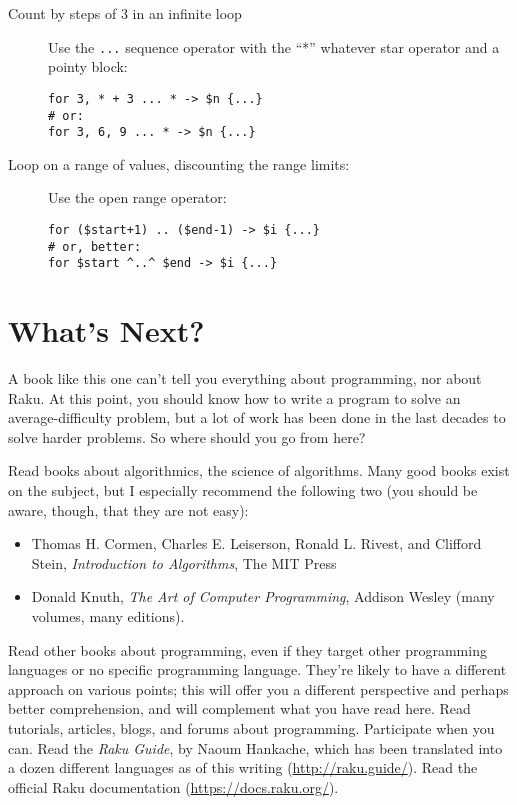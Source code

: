 \begin{description}
\item[Count by steps of 3 in an infinite loop] Use the \verb'...' 
sequence operator with the ``*'' whatever star operator and 
a pointy block:

\begin{verbatim}
for 3, * + 3 ... * -> $n {...}
# or:
for 3, 6, 9 ... * -> $n {...}    
\end{verbatim}

\item[Loop on a range of values, discounting the range limits:] Use 
the open range operator:

\begin{verbatim}
for ($start+1) .. ($end-1) -> $i {...}
# or, better:
for $start ^..^ $end -> $i {...}
\end{verbatim}
\end{description}

\section{What's Next?}

A book like this one can't tell you everything about programming,  
nor about Raku. At this point, you should know how to write a 
program to solve an average-difficulty problem, but a lot of work 
has been done in the last decades to solve harder problems. So 
where should you go from here?

Read books about algorithmics, the science of algorithms. Many good 
books exist on the subject, but I especially recommend the following 
two (you should be aware, though, that they are not easy):
\begin{itemize}
\item Thomas H. Cormen, Charles E. Leiserson, Ronald L. Rivest, 
and Clifford Stein, \emph{Introduction to 
Algorithms}, The MIT Press
\item Donald Knuth, \emph{The Art of Computer Programming}, Addison Wesley 
(many volumes, many editions).
\end{itemize}

Read other books about programming, even if they 
target other programming languages or no specific programming 
language. They're likely to have a 
different approach on various points; this will offer you a 
different perspective and perhaps better comprehension, and 
will complement what you have read here. 
Read tutorials, articles, blogs, and forums about programming. 
Participate when you can. Read the \emph{Raku Guide}, by Naoum Hankache, which has been translated into a dozen different languages as of 
this writing (\url{http://raku.guide/}). Read the 
official Raku documentation (\url{https://docs.raku.org/}).

